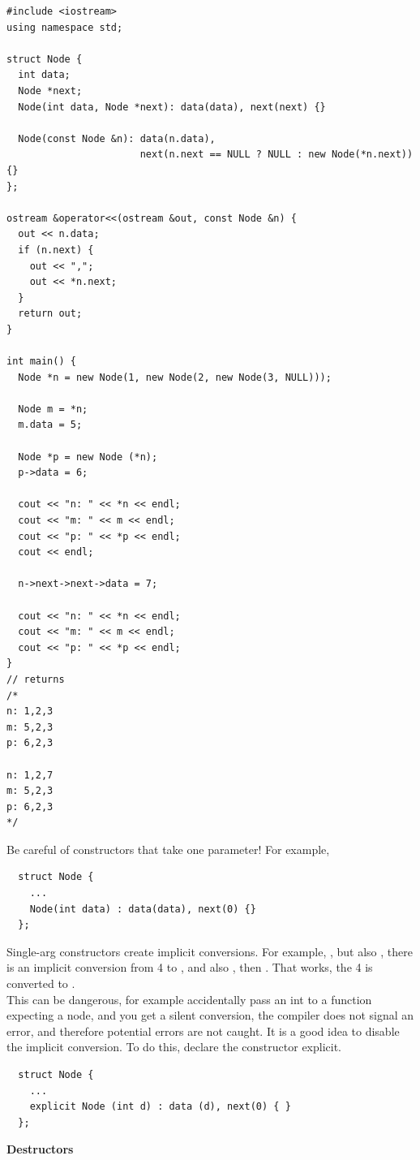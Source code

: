 \documentclass[english, 11pt]{article}
\begin{document}
\begin{lstlisting}
#include <iostream>
using namespace std;

struct Node {
  int data;
  Node *next;
  Node(int data, Node *next): data(data), next(next) {}

  Node(const Node &n): data(n.data),
                       next(n.next == NULL ? NULL : new Node(*n.next)) {}
};

ostream &operator<<(ostream &out, const Node &n) {
  out << n.data;
  if (n.next) {
    out << ",";
    out << *n.next;
  }
  return out;
}

int main() {
  Node *n = new Node(1, new Node(2, new Node(3, NULL)));

  Node m = *n;
  m.data = 5;

  Node *p = new Node (*n);
  p->data = 6;

  cout << "n: " << *n << endl;
  cout << "m: " << m << endl;
  cout << "p: " << *p << endl;
  cout << endl;

  n->next->next->data = 7;

  cout << "n: " << *n << endl;
  cout << "m: " << m << endl;
  cout << "p: " << *p << endl;
}
// returns
/*
n: 1,2,3
m: 5,2,3
p: 6,2,3

n: 1,2,7
m: 5,2,3
p: 6,2,3
*/
\end{lstlisting}
\begin{note}
  Be careful of constructors that take one parameter! For example,
  \begin{lstlisting}
  struct Node {
    ...
    Node(int data) : data(data), next(0) {}
  };
  \end{lstlisting}
  Single-arg constructors create implicit conversions. For example, , but also , there is an implicit conversion from 4 to , and also , then . That works, the 4 is converted to . \\
  This can be dangerous, for example accidentally pass an int to a function expecting a node, and you get a silent conversion, the compiler does not signal an error, and therefore potential errors are not caught. It is a good idea to disable the implicit conversion. To do this, declare the constructor explicit.
  \begin{lstlisting}
  struct Node {
    ...
    explicit Node (int d) : data (d), next(0) { }
  };
  \end{lstlisting}
\end{note}

\textbf{Destructors} \\
\end{document}
